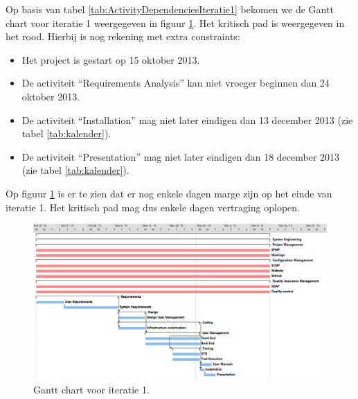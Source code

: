 Op basis van tabel \ref{tab:ActivityDependenciesIteratie1} bekomen we de Gantt chart voor iteratie 1 weergegeven in figuur \ref{fig:GantChartIT1}. Het kritisch pad is weergegeven in het rood. Hierbij is nog rekening met extra constraints:
\begin{itemize}
	\item Het project is gestart op 15 oktober 2013.
	\item De activiteit ``Requirements Analysis'' kan niet vroeger beginnen dan 24 oktober 2013.
	\item De activiteit ``Installation'' mag niet later eindigen dan 13 december 2013 (zie tabel \ref{tab:kalender}).
	\item De activiteit ``Presentation'' mag niet later eindigen dan 18 december 2013 (zie tabel \ref{tab:kalender}).
\end{itemize}
Op figuur \ref{fig:GantChartIT1} is er te zien dat er nog enkele dagen marge zijn op het einde van iteratie 1. Het kritisch pad mag dus enkele dagen vertraging oplopen.

\begin{landscape}
	\begin{figure} [H]
		\centering
		\includegraphics[width = 1.35\textwidth]{ManagerialProcess/GanttChartIT1.png}	
		\caption{Gantt chart voor iteratie 1.}
		\label{fig:GantChartIT1}
	\end{figure}
\end{landscape}



